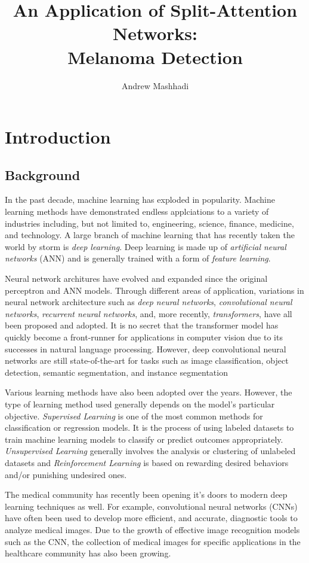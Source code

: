 \documentclass [MAS] {uclathes}
\title          {An Application of Split-Attention Networks:\\
                Melanoma Detection}
\author         {Andrew Mashhadi}
\begin{document}
\makeintropages


\chapter{Introduction}

\section{Background}

In the past decade, machine learning has exploded in popularity. Machine learning methods have demonstrated endless applciations to a variety of industries including, but not limited to, engineering, science, finance, medicine, and technology. A large branch of machine learning that has recently taken the world by storm is \textit{deep learning}. Deep learning is made up of \textit{artificial neural networks} (ANN) and is generally trained with a form of \textit{feature learning}. 

Neural network architures have evolved and expanded since the original perceptron and ANN models. Through different areas of application, variations in neural network architecture such as \textit{deep neural networks}, \textit{convolutional neural networks}, \textit{recurrent neural networks}, and, more recently, \textit{transformers}, have all been proposed and adopted. It is no secret that the transformer model has quickly become a front-runner for applications in computer vision due to its successes in natural language processing. However, deep convolutional neural networks are still state-of-the-art for tasks such as image classification, object detection, semantic segmentation, and instance segmentation

Various learning methods have also been adopted over the years. However, the type of learning method used generally depends on the model's particular objective. \textit{Supervised Learning} is one of the most common methods for classification or regression models. It is the process of using labeled datasets to train machine learning models to classify or predict outcomes appropriately. \textit{Unsupervised Learning} generally involves the analysis or clustering of unlabeled datasets and \textit{Reinforcement Learning} is based on rewarding desired behaviors and/or punishing undesired ones.

The medical community has recently been opening it's doors to modern deep learning techniques as well. For example, convolutional neural networks (CNNs) have often been used to develop more efficient, and accurate, diagnostic tools to analyze medical images. Due to the growth of effective image recognition models such as the CNN, the collection of medical images for specific applications in the healthcare community has also been growing. 
\end{document}
